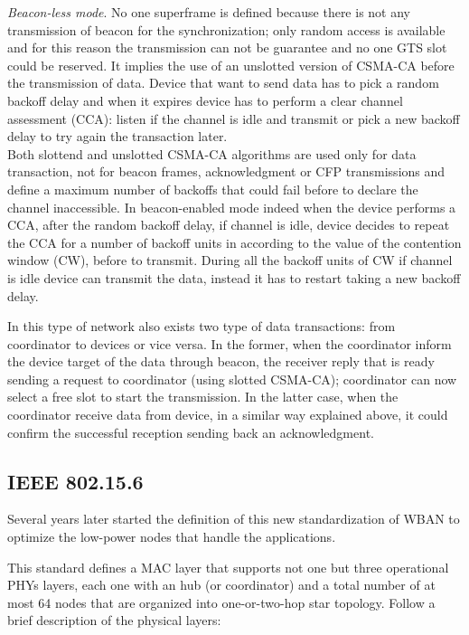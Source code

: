 \documentclass[conference]{IEEEtran}
\begin{document}
\textit{Beacon-less mode}. No one superframe is defined because there is not any transmission of beacon for the synchronization; only random access is available and for this reason the transmission can not be guarantee and no one GTS slot could be reserved. It implies the use of an unslotted version of CSMA-CA before the transmission of data. Device that want to send data has to pick a random backoff delay and when it expires device has to perform a clear channel assessment (CCA): listen if the channel is idle and transmit or pick a new backoff delay to try again the transaction later. 
\newline
\\Both slottend and unslotted CSMA-CA algorithms are used only for data transaction, not for beacon frames, acknowledgment or CFP transmissions and define a maximum number of backoffs that could fail before to declare the channel inaccessible. In beacon-enabled mode indeed when the device performs a CCA, after the random backoff delay, if channel is idle, device decides to repeat the CCA for a number of backoff units in according to the value of the contention window (CW), before to transmit. During all the backoff units of CW if channel is idle device can transmit the data, instead it has to restart taking a new backoff delay. 

In this type of network also exists two type of data transactions: from coordinator to devices or vice versa. In the former, when the coordinator inform the device target of the data through beacon, the receiver reply that is ready sending a request to coordinator (using slotted CSMA-CA); coordinator can now select a free slot to start the transmission. In the latter case, when the coordinator receive data from device, in a similar way explained above, it could confirm the successful reception sending back an acknowledgment. \cite{li2009performance} 


\subsection{IEEE 802.15.6}
Several years later started the definition of this new standardization of WBAN to optimize the low-power nodes that handle the applications.

This standard defines a MAC layer that supports not one but three operational PHYs layers, each one with an hub (or coordinator) and a total number of at most 64 nodes that are organized into one-or-two-hop star topology. Follow a brief description of the physical layers:
\newline
\end{document}
